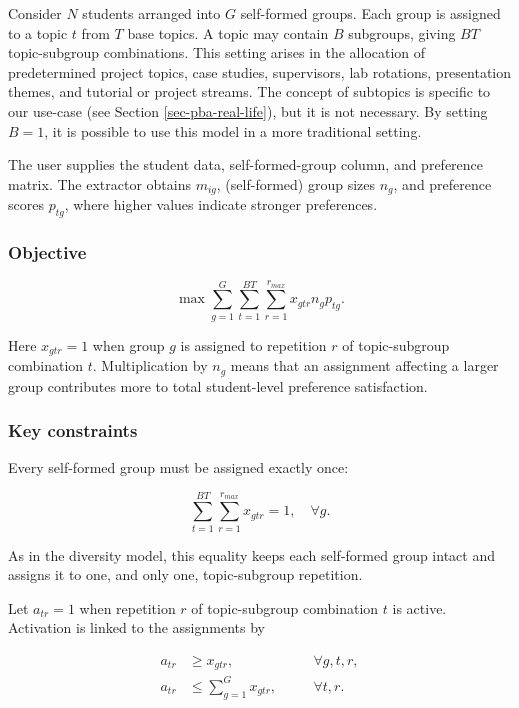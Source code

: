 Consider \(N\) students arranged into \(G\) self-formed groups. Each group is
assigned to a topic \(t\) from \(T\) base topics.
A topic may contain \(B\) subgroups, giving \(BT\)
topic-subgroup combinations. This setting arises in the allocation of
predetermined project topics, case studies, supervisors, lab rotations,
presentation themes, and tutorial or project streams. The concept of subtopics
is specific to our use-case (see Section \ref{sec-pba-real-life}), but it is
not necessary. By setting \(B=1\), it is possible to use this  model
in a more traditional setting.

The user supplies the student data, self-formed-group column, and preference
matrix. The extractor obtains \(m_{ig}\), (self-formed) group sizes \(n_g\), and preference
scores \(p_{tg}\), where higher values indicate stronger preferences.

\subsubsection{Objective}\label{objective-1}

\[
\max\sum_{g=1}^{G}\sum_{t=1}^{BT}\sum_{r=1}^{r_{max}}
x_{gtr}n_gp_{tg}.
\]

Here \(x_{gtr}=1\) when group \(g\) is assigned to repetition \(r\) of
topic-subgroup combination \(t\). Multiplication by \(n_g\) means that an
assignment affecting a larger group contributes more to total student-level
preference satisfaction.

\subsubsection{Key constraints}\label{key-constraints-1}

Every self-formed group must be assigned exactly once:

\[
\sum_{t=1}^{BT}\sum_{r=1}^{r_{max}}x_{gtr}=1,\quad \forall g. \tag{6}
\]

As in the diversity model, this equality keeps each self-formed group intact and
assigns it to one, and only one, topic-subgroup repetition.

Let \(a_{tr}=1\) when repetition \(r\) of topic-subgroup combination \(t\) is
active. Activation is linked to the assignments by

\[
\begin{aligned}
a_{tr}&\geq x_{gtr},&&\quad \forall g,t,r,\\
a_{tr}&\leq\sum_{g=1}^{G}x_{gtr},&&\quad \forall t,r.
\end{aligned} \tag{7}
\]

